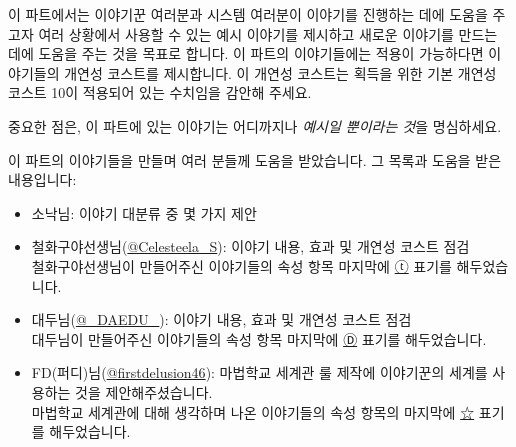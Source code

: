 \documentclass{report}
\begin{document}
	이 파트에서는 이야기꾼 여러분과 시스템 여러분이 이야기를 진행하는 데에 도움을 주고자 여러 상황에서 사용할 수 있는 예시 이야기를 제시하고 새로운 이야기를 만드는 데에 도움을 주는 것을 목표로 합니다. 이 파트의 이야기들에는 적용이 가능하다면 이야기들의 개연성 코스트를 제시합니다. 이 개연성 코스트는 획득을 위한 기본 개연성 코스트 10이 적용되어 있는 수치임을 감안해 주세요.
	
	중요한 점은, 이 파트에 있는 이야기는 어디까지나 \emph{예시일 뿐이라는 것}을 명심하세요.
	
	이 파트의 이야기들을 만들며 여러 분들께 도움을 받았습니다. 그 목록과 도움을 받은 내용입니다:
	\begin{itemize}
		\item 소낙님: 이야기 대분류 중 몇 가지 제안
		
		\item \hypertarget{celesteela}{}철화구야선생님(\href{https://twitter.com/Celesteela_S}{@Celesteela\_S}): 이야기 내용, 효과 및 개연성 코스트 점검\\
		철화구야선생님이 만들어주신 이야기들의 속성 항목 마지막에 \hyperlink{celesteela}{ⓣ} 표기를 해두었습니다.
		
		\item \hypertarget{daedu}{}대두님(\href{https://twitter.com/_DAEDU_}{@\_DAEDU\_}): 이야기 내용, 효과 및 개연성 코스트 점검\\
		대두님이 만들어주신 이야기들의 속성 항목 마지막에 \hyperlink{daedu}{Ⓓ}  표기를 해두었습니다.
		
		\item \hypertarget{fd46}{}FD(퍼디)님(\href{https://twitter.com/firstdelusion46}{@firstdelusion46}): 마법학교 세계관 룰 제작에 이야기꾼의 세계를 사용하는 것을 제안해주셨습니다.\\
		마법학교 세계관에 대해 생각하며 나온 이야기들의 속성 항목의 마지막에 \hyperlink{fd46}{☆} 표기를 해두었습니다.
	\end{itemize}
\end{document}
